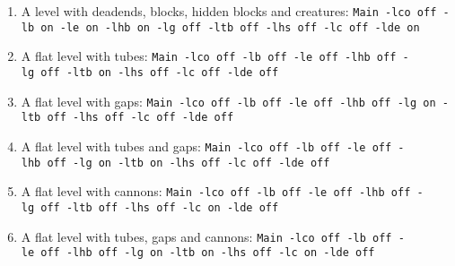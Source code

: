 \documentclass{report}
\begin{document}
\begin{enumerate}
\item A level with deadends, blocks, hidden blocks and creatures:\newline %
\texttt{Main~-lco~off~-lb~on~-le~on~-lhb~on~-lg~off~-ltb~off~-lhs~off~-lc~off~-lde~on}
\item A flat level with tubes: \newline %
\texttt{Main~-lco~off~-lb~off~-le~off~-lhb~off~-lg~off~-ltb~on~-lhs~off~-lc~off~-lde~off}
\item A flat level with gaps: \newline %
\texttt{Main~-lco~off~-lb~off~-le~off~-lhb~off~-lg~on~-ltb~off~-lhs~off~-lc~off~-lde~off}
\item A flat level with tubes and gaps: \newline %
\texttt{Main~-lco~off~-lb~off~-le~off~-lhb~off~-lg~on~-ltb~on~-lhs~off~-lc~off~-lde~off}
\item A flat level with cannons: \newline %
\texttt{Main~-lco~off~-lb~off~-le~off~-lhb~off~-lg~off~-ltb~off~-lhs~off~-lc~on~-lde~off}
\item A flat level with tubes, gaps and cannons: \newline %
\texttt{Main~-lco~off~-lb~off~-le~off~-lhb~off~-lg~on~-ltb~on~-lhs~off~-lc~on~-lde~off}
\end{enumerate}
\end{document}
